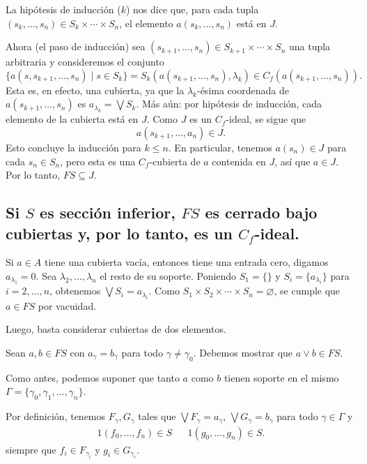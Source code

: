 \documentclass[12pt,letterpaper,titlepage]{article}
\let\emptyset\varnothing
\theoremstyle{definition}
\renewcommand\sup{\vee}
\newcommand\Sup{\bigvee}
\newcommand\tps[1]{\texorpdfstring{#1}{}}
\newcommand\<{\langle}
\renewcommand\>{\rangle}
\begin{document}
La hipótesis de inducción ($k$) nos dice que, para cada tupla
$(s_k,\dots,s_n)\in S_k\times\cdots\times S_n$,
el elemento $a(s_k,\dots,s_n)$ está en $J$.

Ahora (el paso de inducción)
sea $(s_{k+1},\dots,s_n)\in S_{k+1}\times\cdots\times S_n$
una tupla arbitraria y consideremos el conjunto
\[
  \{a(s,s_{k+1},\dots,s_n) \mid s\in S_k\}
  =
  S_k(a(s_{k+1},\dots,s_n),\lambda_k)
  \in
  C_f(a(s_{k+1},\dots,s_n))
.\]
Esta es, en efecto, una cubierta, ya que la $\lambda_k$-ésima
coordenada de $a(s_{k+1},\dots,s_n)$ es $a_{\lambda_k}=\Sup S_k$.
Más aún: por hipótesis de inducción, cada elemento
de la cubierta está en $J$.
Como $J$ es un $C_f$-ideal, se sigue que
\[
  a(s_{k+1},\dots,a_n) \in J
.\]
Esto concluye la inducción para $k\leq n$.
En particular, tenemos $a(s_n)\in J$ para cada $s_n\in S_n$,
pero esta es una $C_f$-cubierta de $a$ contenida en $J$,
así que $a\in J$.
Por lo tanto, $FS\subseteq J$.

\subsection{Si \tps{$S$} es sección inferior, \tps{$FS$} es cerrado bajo
cubiertas y, por lo tanto, es un \tps{$C_f$}-ideal.}

Si $a\in A$ tiene una cubierta vacía, entonces tiene una entrada
cero, digamos $a_{\lambda_1}=0$.
Sea $\lambda_2,\dots,\lambda_n$ el resto de su soporte.
Poniendo $S_1=\{\}$ y $S_i=\{a_{\lambda_i}\}$ para $i=2,\dots,n$,
obtenemos $\Sup S_i = a_{\lambda_i}$.
Como $S_1\times S_2\times\cdots\times S_n=\emptyset$,
se cumple que $a\in FS$ por vacuidad.

Luego, basta considerar cubiertas de dos elementos.

Sean $a,b\in FS$ con $a_\gamma=b_\gamma$ para todo
$\gamma\neq\gamma_0$.
Debemos mostrar que $a\sup b\in FS$.

Como antes, podemos suponer que tanto $a$ como $b$ tienen soporte
en el mismo $\Gamma=\{\gamma_0,\gamma_1,\dots,\gamma_n\}$.

Por definición, tenemos $F_\gamma,G_\gamma$ tales que $\Sup
F_\gamma = a_\gamma$, $\Sup G_\gamma = b_\gamma$ para todo
$\gamma\in\Gamma$ y
\begin{align*}
  1(f_0,\dots,f_n)\in S && 1(g_0,\dots,g_n)\in S.
\end{align*}
siempre que $f_i\in F_{\gamma_i}$ y $g_i\in G_{\gamma_i}$.
\end{document}
